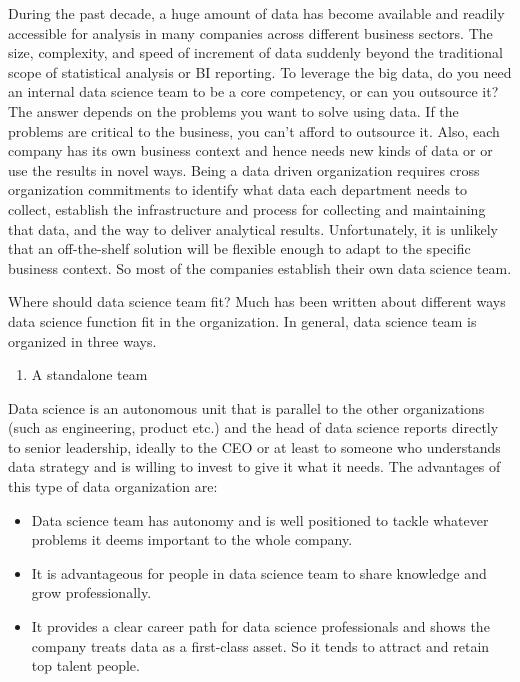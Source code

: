 \documentclass[12pt,]{krantz}
\providecommand{\tightlist}{%
  \setlength{\itemsep}{0pt}\setlength{\parskip}{0pt}}
\begin{document}
During the past decade, a huge amount of data has become available and readily accessible for analysis in many companies across different business sectors. The size, complexity, and speed of increment of data suddenly beyond the traditional scope of statistical analysis or BI reporting. To leverage the big data, do you need an internal data science team to be a core competency, or can you outsource it? The answer depends on the problems you want to solve using data. If the problems are critical to the business, you can't afford to outsource it. Also, each company has its own business context and hence needs new kinds of data or or use the results in novel ways. Being a data driven organization requires cross organization commitments to identify what data each department needs to collect, establish the infrastructure and process for collecting and maintaining that data, and the way to deliver analytical results. Unfortunately, it is unlikely that an off-the-shelf solution will be flexible enough to adapt to the specific business context. So most of the companies establish their own data science team.

Where should data science team fit? Much has been written about different ways data science function fit in the organization. In general, data science team is organized in three ways.

\begin{enumerate}
\def\labelenumi{(\arabic{enumi})}
\tightlist
\item
  A standalone team
\end{enumerate}

Data science is an autonomous unit that is parallel to the other organizations (such as engineering, product etc.) and the head of data science reports directly to senior leadership, ideally to the CEO or at least to someone who understands data strategy and is willing to invest to give it what it needs. The advantages of this type of data organization are:

\begin{itemize}
\tightlist
\item
  Data science team has autonomy and is well positioned to tackle whatever problems it deems important to the whole company.
\item
  It is advantageous for people in data science team to share knowledge and grow professionally.
\item
  It provides a clear career path for data science professionals and shows the company treats data as a first-class asset. So it tends to attract and retain top talent people.
\end{itemize}
\end{document}
